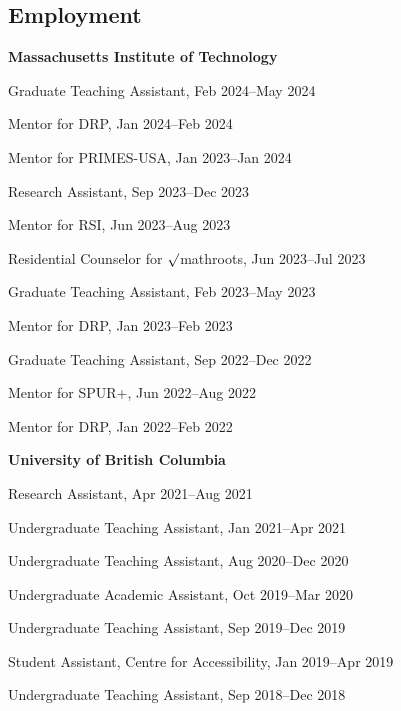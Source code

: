 \documentclass[margin,line]{res}
\newenvironment{list1}{
  \begin{list}{\ding{113}}{%
      \setlength{\itemsep}{0in}
      \setlength{\parsep}{0.025in} \setlength{\parskip}{0in}
      \setlength{\topsep}{0in} \setlength{\partopsep}{0in}
      \setlength{\leftmargin}{0.17in}}}{\end{list}}
\begin{document}
\begin{resume}
\section{\sc Employment}

{\bf Massachusetts Institute of Technology}\\
\vspace*{-.1in}
\begin{list1}
\item[] Graduate Teaching Assistant, Feb 2024--May 2024
\item[] Mentor for DRP, Jan 2024--Feb 2024
\item[] Mentor for PRIMES-USA, Jan 2023--Jan 2024
\item[] Research Assistant, Sep 2023--Dec 2023
\item[] Mentor for RSI, Jun 2023--Aug 2023
\item[] Residential Counselor for $\surd$mathroots, Jun 2023--Jul 2023
\item[] Graduate Teaching Assistant, Feb 2023--May 2023
\item[] Mentor for DRP, Jan 2023--Feb 2023
\item[] Graduate Teaching Assistant, Sep 2022--Dec 2022
\item[] Mentor for SPUR+, Jun 2022--Aug 2022
\item[] Mentor for DRP, Jan 2022--Feb 2022
\end{list1}

{\bf University of British Columbia}\\
\vspace*{-.1in}
\begin{list1}
\item[] Research Assistant, Apr 2021--Aug 2021 %
\item[] Undergraduate Teaching Assistant, Jan 2021--Apr 2021
\item[] Undergraduate Teaching Assistant, Aug 2020--Dec 2020
\item[] Undergraduate Academic Assistant, Oct 2019--Mar 2020
\item[] Undergraduate Teaching Assistant, Sep 2019--Dec 2019
\item[] Student Assistant, Centre for Accessibility, Jan 2019--Apr 2019
\item[] Undergraduate Teaching Assistant, Sep 2018--Dec 2018
\end{list1}


\end{resume}
\end{document}
